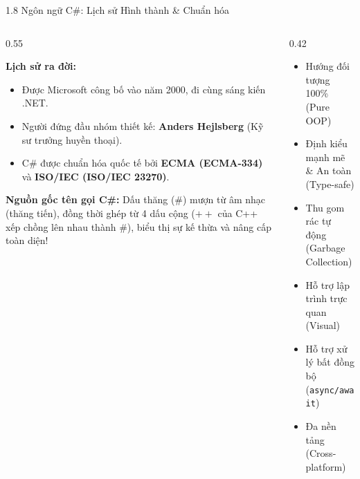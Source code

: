 \documentclass[aspectratio=169, 10pt]{beamer}
\begin{document}
\begin{frame}{1.8 Ngôn ngữ C\#: Lịch sử Hình thành \& Chuẩn hóa}
  \begin{columns}[c]
    \begin{column}{0.55\textwidth}
      \begin{block}{\textbf{Lịch sử ra đời:}}
        \begin{itemize}
          \item Được Microsoft công bố vào năm 2000, đi cùng sáng kiến .NET.
          \item Người đứng đầu nhóm thiết kế: \textbf{Anders Hejlsberg} (Kỹ sư trưởng huyền thoại).
          \item C\# được chuẩn hóa quốc tế bởi \textbf{ECMA (ECMA-334)} và \textbf{ISO/IEC (ISO/IEC 23270)}.
        \end{itemize}
      \end{block}
      \begin{exampleblock}{\textbf{Nguồn gốc tên gọi C\#:}}
        Dấu thăng (\#) mượn từ âm nhạc (thăng tiến), đồng thời ghép từ 4 dấu cộng ($++$ của C++ xếp chồng lên nhau thành $\#$), biểu thị sự kế thừa và nâng cấp toàn diện!
      \end{exampleblock}
    \end{column}
    \begin{column}{0.42\textwidth}
      \begin{tcolorbox}[colback=CSharpPurple!10,colframe=CSharpPurple,title=\textbf{Đặc trưng Cốt lõi của C\#}]
        \begin{itemize}\scriptsize
          \item Hướng đối tượng 100\% (Pure OOP)
          \item Định kiểu mạnh mẽ \& An toàn (Type-safe)
          \item Thu gom rác tự động (Garbage Collection)
          \item Hỗ trợ lập trình trực quan (Visual)
          \item Hỗ trợ xử lý bất đồng bộ (\texttt{async/await})
          \item Đa nền tảng (Cross-platform)
        \end{itemize}
      \end{tcolorbox}
    \end{column}
  \end{columns}
\end{frame}
\end{document}
